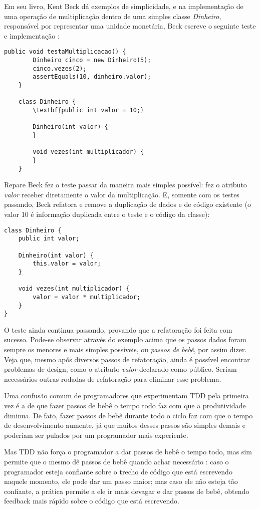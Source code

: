 Em seu livro, Kent Beck dá exemplos de simplicidade, e na implementação de uma
operação de multiplicação dentro de uma simples classe \textit{Dinheiro},
responsável por representar uma unidade monetária, Beck escreve o seguinte
teste e implementação \cite{TDDByExample}:

\begin{lstlisting}[frame=trbl]
    public void testaMultiplicacao() {
		Dinheiro cinco = new Dinheiro(5);
		cinco.vezes(2);
		assertEquals(10, dinheiro.valor);
	}
	
	class Dinheiro {
		\textbf{public int valor = 10;}
		
		Dinheiro(int valor) {
		}
		
		void vezes(int multiplicador) {
		}
	}

\end{lstlisting}

Repare Beck fez o teste passar da maneira mais simples possível: fez o atributo
\textit{valor} receber diretamente o valor da multiplicação. E, somente com os
testes passando, Beck refatora e remove a duplicação de dados e de código
existente (o valor 10 é informação duplicada entre o teste e o código da
classe):

\begin{lstlisting}[frame=trbl]
class Dinheiro {
	public int valor;
	
	Dinheiro(int valor) {
		this.valor = valor;
	}
	
	void vezes(int multiplicador) {
		valor = valor * multiplicador;
	}
}
\end{lstlisting}

O teste ainda continua passando, provando que a refatoração foi feita com
sucesso. Pode-se observar através do exemplo acima que os passos dados foram
sempre os menores e mais simples possíveis, ou \textit{passos de bebê}, por
assim dizer. Veja que, mesmo após diversos passos de refatoração, ainda é
possível encontrar problemas de design, como o atributo \textit{valor}
declarado como público. Seriam necessários outras rodadas de refatoração para
eliminar esse problema.

Uma confusão comum de programadores que experimentam TDD pela primeira vez é a
de que fazer passos de bebê o tempo todo faz com que a produtividade diminua.
De fato, fazer passos de bebê durante todo o ciclo faz com que o tempo de
desenvolvimento aumente, já que muitos desses passos são simples demais e
poderiam ser pulados por um programador mais experiente. 

Mas TDD não força o programador a dar passos de bebê o tempo todo, mas sim
permite que o mesmo dê passos de bebê quando achar necessário
\cite{TDDByExample}: caso o programador esteja confiante sobre o trecho de
código  que está escrevendo naquele momento, ele pode dar um passo maior;  mas
caso ele não esteja tão confiante, a prática permite a ele ir mais devagar e 
dar passos de bebê, obtendo feedback mais rápido sobre o código que está
escrevendo.

